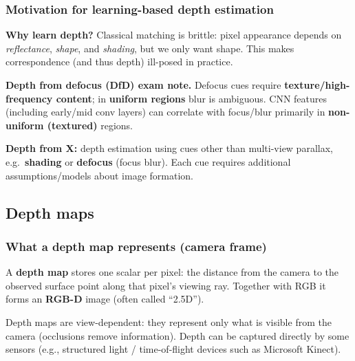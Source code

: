 \documentclass[11pt,a4paper]{article}
\begin{document}
\subsubsection{Motivation for learning-based depth estimation}
\begin{intbox}
\textbf{Why learn depth?} Classical matching is brittle: pixel appearance depends on \emph{reflectance}, \emph{shape},
and \emph{shading}, but we only want shape. This makes correspondence (and thus depth) ill-posed in practice.
\end{intbox}

\begin{notebox}
\textbf{Depth from defocus (DfD) exam note.} Defocus cues require \textbf{texture/high-frequency content}; in \textbf{uniform regions} blur is ambiguous.
CNN features (including early/mid conv layers) can correlate with focus/blur primarily in \textbf{non-uniform (textured)} regions.
\end{notebox}

\begin{defbox}
\textbf{Depth from X:} depth estimation using cues other than multi-view parallax, e.g.\ \textbf{shading} or
\textbf{defocus} (focus blur). Each cue requires additional assumptions/models about image formation.
\end{defbox}

\subsection{Depth maps}

\subsubsection{What a depth map represents (camera frame)}
\begin{defbox}
A \textbf{depth map} stores one scalar per pixel: the distance from the camera to the observed surface point along that pixel's viewing ray.
Together with RGB it forms an \textbf{RGB-D} image (often called ``2.5D'').
\end{defbox}

\begin{notebox}
Depth maps are view-dependent: they represent only what is visible from the camera (occlusions remove information).
Depth can be captured directly by some sensors (e.g., structured light / time-of-flight devices such as Microsoft Kinect).
\end{notebox}
\end{document}
